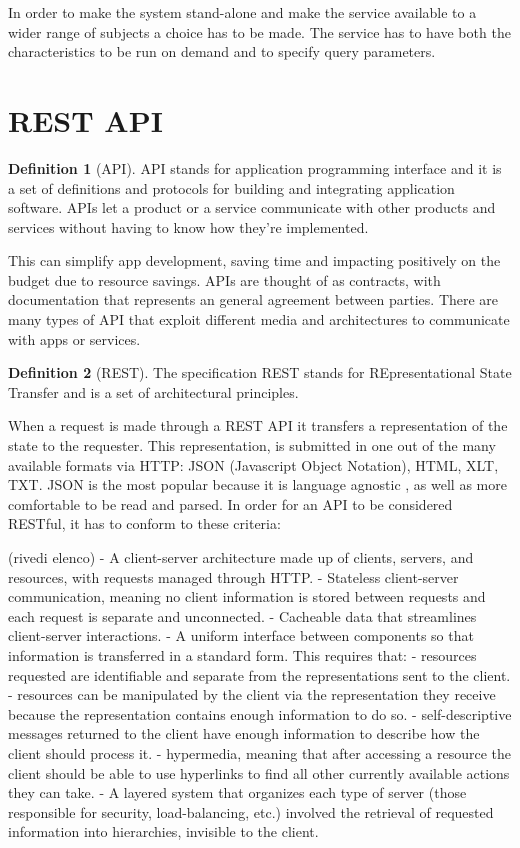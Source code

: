 \documentclass[
  12pt,
  a4paper,
  oneside]{book}
\theoremstyle{definition}
\newtheorem{definition}{Definition}[chapter]
\theoremstyle{definition}
\theoremstyle{definition}
\theoremstyle{remark}
\begin{document}
In order to make the system stand-alone and make the service available to a wider range of subjects a choice has to be made. The service has to have both the characteristics to be run on demand and to specify query parameters.

\hypertarget{rest-api}{%
\section{REST API}\label{rest-api}}

\begin{definition}[API]
\protect\hypertarget{def:api}{}{\label{def:api} {} }API stands for application programming interface and it is a set of definitions and protocols for building and integrating application software. APIs let a product or a service communicate with other products and services without having to know how they're implemented.
\end{definition}
This can simplify app development, saving time and impacting positively on the budget due to resource savings. APIs are thought of as contracts, with documentation that represents an general agreement between parties.
There are many types of API that exploit different media and architectures to communicate with apps or services.
\begin{definition}[REST]
\protect\hypertarget{def:rest}{}{\label{def:rest} {} }The specification REST stands for REpresentational State Transfer and is a set of architectural principles.
\end{definition}
When a request is made through a REST API it transfers a representation of the state to the requester. This representation, is submitted in one out of the many available formats via HTTP: JSON (Javascript Object Notation), HTML, XLT, TXT. JSON is the most popular because it is language agnostic \citep{what_is_a_rest_api}, as well as more comfortable to be read and parsed.
In order for an API to be considered RESTful, it has to conform to these criteria:

(rivedi elenco)
- A client-server architecture made up of clients, servers, and resources, with requests managed through HTTP.
- Stateless client-server communication, meaning no client information is stored between requests and each request is separate and unconnected.
- Cacheable data that streamlines client-server interactions.
- A uniform interface between components so that information is transferred in a standard form. This requires that:
- resources requested are identifiable and separate from the representations sent to the client.
- resources can be manipulated by the client via the representation they receive because the representation contains enough information to do so.
- self-descriptive messages returned to the client have enough information to describe how the client should process it.
- hypermedia, meaning that after accessing a resource the client should be able to use hyperlinks to find all other currently available actions they can take.
- A layered system that organizes each type of server (those responsible for security, load-balancing, etc.) involved the retrieval of requested information into hierarchies, invisible to the client.
\end{document}
